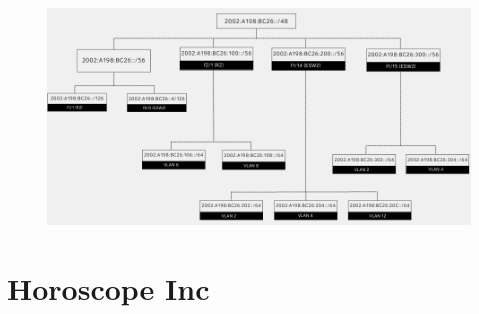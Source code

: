 \documentclass{article}
\begin{document}
\begin{figure}[H]
    \centering
    \includegraphics[width=12cm]{images/ipv6_global_calendar.png}
\end{figure}

\newpage
\clearpage

\section*{Horoscope Inc}

\end{document}
